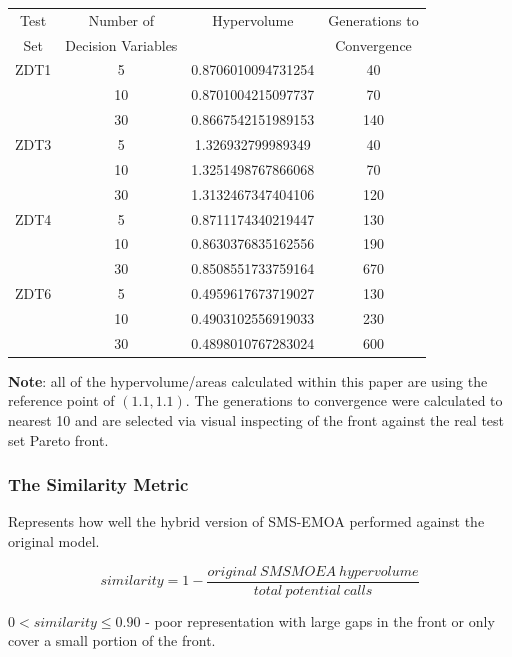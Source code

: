\documentclass[sigconf,review,nonacm]{acmart}
\begin{document}
\begin{center}
\begin{tabular}{c|c|c|c}
    Test & Number of & Hypervolume & Generations to \\
    Set & Decision Variables &   & Convergence \\ \hline
    ZDT1  &     5   & 0.8706010094731254 & 40 \\ 
          &     10  & 0.8701004215097737 & 70 \\
          &     30  & 0.8667542151989153 & 140 \\ \hline
    ZDT3  &     5   & 1.326932799989349 & 40 \\ 
          &     10  & 1.3251498767866068 & 70 \\
          &     30  & 1.3132467347404106 & 120\\ \hline
    ZDT4  &     5   & 0.8711174340219447 & 130 \\ 
          &     10  & 0.8630376835162556 & 190 \\
          &     30  & 0.8508551733759164 & 670 \\ \hline
    ZDT6  &     5   & 0.4959617673719027 & 130 \\ 
          &     10  & 0.4903102556919033 & 230 \\
          &     30  & 0.4898010767283024 & 600 \\ 
\end{tabular}
\end{center}

\textbf{Note}: all of the hypervolume/areas calculated within this paper are using the reference point of $(1.1, 1.1)$. The generations to convergence were calculated to nearest 10 and are selected via visual inspecting of the front against the real test set Pareto front. \\

\subsubsection{The Similarity Metric}  

Represents how well the hybrid version of SMS-EMOA performed against the original model.

$$
    similarity = 1 - \frac{original\ SMSMOEA\ hypervolume}{total\ potential\ calls}
$$

$0 < similarity \leq 0.90$ - poor representation with large gaps in the front or only cover a small portion of the front. \\
\end{document}
